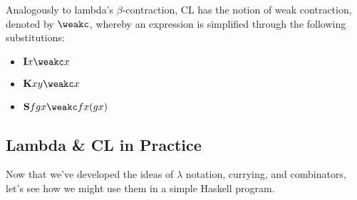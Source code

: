 Analogously to lambda's $\beta$-contraction, CL has the notion of weak contraction, denoted by $\weakc$, whereby an expression is simplified through the following substitutions:
\begin{itemize}
    \item $\Ic x\weakc x$
    \item $\Kc xy\weakc x$
    \item $\Sc fgx\weakc fx(gx)$
\end{itemize}

\subsection{Lambda & CL in Practice}
Now that we've developed the ideas of $\lambda$ notation, currying, and combinators, let's see how we might use them in a simple Haskell program.

